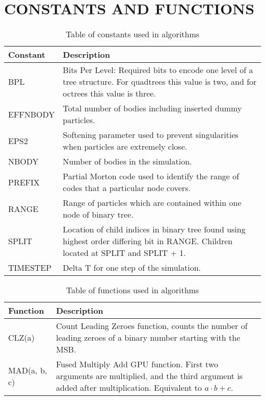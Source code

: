 \documentclass{thesis}
\begin{document}
\chapter{CONSTANTS AND FUNCTIONS}
\begin{table}[!h]
    \centering
    \caption{Table of constants used in algorithms}
    \label{tab:Constants}
    \begin{tabular}{|p{3cm}|p{10cm}|}
        \hline
        Constant & Description \\
        \hline\hline
        BPL & Bits Per Level: Required bits to encode one level of a tree structure. For quadtrees this value is two, and for octrees this value is three.\\
        \hline
        EFFNBODY & Total number of bodies including inserted dummy particles.\\
        \hline
        EPS2 & Softening parameter used to prevent singularities when particles are extremely close.\\
        \hline
        NBODY & Number of bodies in the simulation.\\
        \hline
        PREFIX & Partial Morton code used to identify the range of codes that a particular node covers.\\
        \hline
        RANGE & Range of particles which are contained within one node of binary tree.\\
        \hline
        SPLIT & Location of child indices in binary tree found using highest order differing bit in RANGE. Children located at SPLIT and SPLIT + 1.\\
        \hline
        TIMESTEP & Delta T for one step of the simulation.\\
        \hline
    \end{tabular}
\end{table}
\begin{table}[!h]
    \centering
    \caption{Table of functions used in algorithms}
    \label{tab:Functions}
    \begin{tabular}{|p{3cm}|p{10cm}|}
        \hline
        Function & Description \\
        \hline\hline
        CLZ(a) & Count Leading Zeroes function, counts the number of leading zeroes of a binary number starting with the MSB.\\
        \hline
        MAD(a, b, c) & Fused Multiply Add GPU function. First two arguments are multiplied, and the third argument is added after multiplication. Equivalent to $a \cdot b + c$.\\
        \hline
    \end{tabular}
\end{table}

\end{document}
